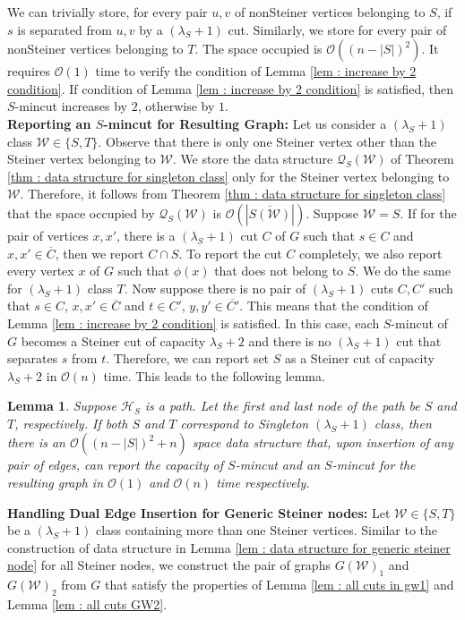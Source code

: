 \documentclass[letterpaper,11pt]{article}
\newtheorem{lemma}{Lemma}[]
\begin{document}
We can trivially store, for every pair $u,v$ of nonSteiner vertices belonging to $S$, if $s$ is separated from $u,v$ by a $(\lambda_S+1)$ cut. Similarly, we store for every pair of nonSteiner vertices belonging to $T$. The space occupied is ${\mathcal O}((n-|S|)^2)$. It requires ${\mathcal O}(1)$ time to verify the condition of Lemma \ref{lem : increase by 2 condition}. If condition of Lemma \ref{lem : increase by 2 condition} is satisfied, then $S$-mincut increases by $2$, otherwise by $1$.\\

\noindent
\textbf{Reporting an $S$-mincut for Resulting Graph:} Let us consider a $(\lambda_S+1)$ class ${\mathcal W}\in \{S,T\}$. Observe that there is only one Steiner vertex other than the Steiner vertex belonging to ${\mathcal W}$. We store the data structure ${\mathcal Q}_S({\mathcal W})$ of Theorem \ref{thm : data structure for singleton class} only for the Steiner vertex belonging to ${\mathcal W}$. Therefore, it follows from Theorem \ref{thm : data structure for singleton class} that the space occupied by ${\mathcal Q}_S({\mathcal W})$ is ${\mathcal O}(|\overline{S({\mathcal W})}|)$. Suppose ${\mathcal W}=S$. If for the pair of vertices $x,x'$, there is a $(\lambda_S+1)$ cut $C$ of $G$ such that $s\in C$ and $x,x'\in \overline{C}$, then we report $C\cap S$. To report the cut $C$ completely, we also report every vertex $x$ of $G$ such that $\phi(x)$ that does not belong to $S$. We do the same for $(\lambda_S+1)$ class $T$. Now suppose there is no pair of $(\lambda_S+1)$ cuts $C,C'$ such that $s\in C$, $x,x'\in \overline{C}$ and  $t\in C'$, $y,y'\in \overline{C'}$. This means that the condition of Lemma \ref{lem : increase by 2 condition} is satisfied. In this case, each $S$-mincut of $G$ becomes a Steiner cut of capacity $\lambda_S+2$ and there is no $(\lambda_S+1)$ cut that separates $s$ from $t$. Therefore, we can report set $S$ as a Steiner cut of capacity $\lambda_S+2$ in ${\mathcal O}(n)$ time. This leads to the following lemma.
\begin{lemma} \label{lem : data structure for dual edge insertion in singleton class}
    Suppose ${\mathcal H}_S$ is a path. Let the first and last node of the path be $S$ and $T$, respectively. If both $S$ and $T$ correspond to Singleton $(\lambda_S+1)$ class, then there is an ${\mathcal O}((n-|S|)^2+n)$ space data structure that, upon insertion of any pair of edges, can report the capacity of $S$-mincut and an $S$-mincut for the resulting graph in ${\mathcal O}(1)$ and ${\mathcal O}(n)$ time respectively.
\end{lemma}
\noindent
\textbf{Handling Dual Edge Insertion for Generic Steiner nodes:} Let ${\mathcal W}\in \{S,T\}$ be a $(\lambda_S+1)$ class containing more than one Steiner vertices. Similar to the construction of data structure in Lemma \ref{lem : data structure for generic steiner node} for all Steiner nodes, we construct the pair of graphs $G({\mathcal W})_1$ and $G({\mathcal W})_2$ from $G$ that satisfy the properties of Lemma \ref{lem : all cuts in gw1} and Lemma \ref{lem : all cuts GW2}.
\end{document}
